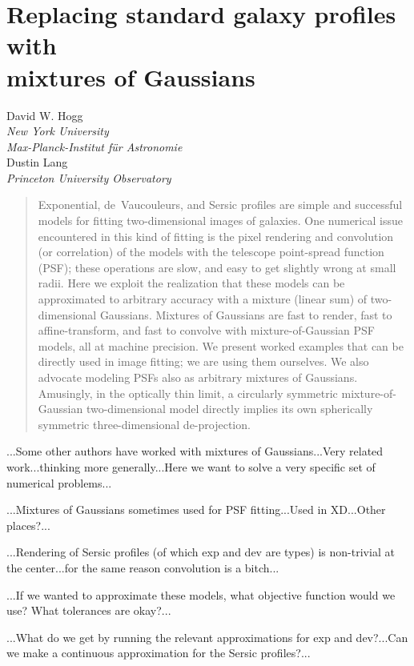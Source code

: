 \documentclass[12pt]{article}
\begin{document}
\section*{Replacing standard galaxy profiles with \\ mixtures of Gaussians}

\noindent
David W. Hogg \\
\textsl{New York University} \\
\textsl{Max-Planck-Institut f\"ur Astronomie} \\[1ex]
Dustin Lang \\
\textsl{Princeton University Observatory}

\begin{abstract}
Exponential, de~Vaucouleurs, and Sersic profiles are simple and
successful models for fitting two-dimensional images of galaxies.  One
numerical issue encountered in this kind of fitting is the pixel
rendering and convolution (or correlation) of the models with the
telescope point-spread function (PSF); these operations are slow, and
easy to get slightly wrong at small radii.  Here we exploit the
realization that these models can be approximated to arbitrary
accuracy with a mixture (linear sum) of two-dimensional Gaussians.
Mixtures of Gaussians are fast to render, fast to affine-transform,
and fast to convolve with mixture-of-Gaussian PSF models, all at
machine precision.  We present worked examples that can be directly
used in image fitting; we are using them ourselves.  We also advocate
modeling PSFs also as arbitrary mixtures of Gaussians.  Amusingly, in
the optically thin limit, a circularly symmetric mixture-of-Gaussian
two-dimensional model directly implies its own spherically symmetric
three-dimensional de-projection.
\end{abstract}

...Some other authors have worked with mixtures of Gaussians...Very
related work...thinking more generally...Here we want to solve a very
specific set of numerical problems...

...Mixtures of Gaussians sometimes used for PSF fitting...Used in
XD...Other places?...

...Rendering of Sersic profiles (of which exp and dev are types) is
non-trivial at the center...for the same reason convolution is a
bitch...

...If we wanted to approximate these models, what objective function
would we use?  What tolerances are okay?...

...What do we get by running the relevant approximations for exp and
dev?...Can we make a continuous approximation for the Sersic
profiles?...
\end{document}

